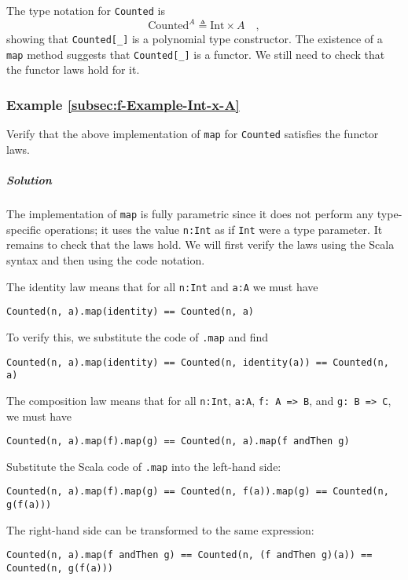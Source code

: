 The type notation for \lstinline!Counted! is
\[
\text{Counted}^{A}\triangleq\text{Int}\times A\quad,
\]
showing that \lstinline!Counted[_]! is a polynomial
type constructor. The existence of a \lstinline!map! method suggests
that \lstinline!Counted[_]! is a functor. We still need to check
that the functor laws hold for it.

\subsubsection{Example \label{subsec:f-Example-Int-x-A}\ref{subsec:f-Example-Int-x-A}}

Verify that the above implementation of \lstinline!map! for \lstinline!Counted!
satisfies the functor laws. 

\subparagraph{Solution}

The implementation of \lstinline!map! is fully parametric since it
does not perform any type-specific operations; it uses the value \lstinline!n:Int!
as if \lstinline!Int! were a type parameter. It remains to check
that the laws hold. We will first verify the laws using the Scala
syntax and then using the code notation.

The identity law means that for all \lstinline!n:Int! and \lstinline!a:A!
we must have
\begin{lstlisting}
Counted(n, a).map(identity) == Counted(n, a)
\end{lstlisting}
To verify this, we substitute the code of \lstinline!.map! and find
\begin{lstlisting}
Counted(n, a).map(identity) == Counted(n, identity(a)) == Counted(n, a)
\end{lstlisting}

The composition law means that for all \lstinline!n:Int!, \lstinline!a:A!,
\lstinline!f: A => B!, and \lstinline!g: B => C!, we must have
\begin{lstlisting}
Counted(n, a).map(f).map(g) == Counted(n, a).map(f andThen g)
\end{lstlisting}
Substitute the Scala code of \lstinline!.map! into the left-hand
side:
\begin{lstlisting}
Counted(n, a).map(f).map(g) == Counted(n, f(a)).map(g) == Counted(n, g(f(a)))
\end{lstlisting}
The right-hand side can be transformed to the same expression:
\begin{lstlisting}
Counted(n, a).map(f andThen g) == Counted(n, (f andThen g)(a)) == Counted(n, g(f(a)))
\end{lstlisting}

